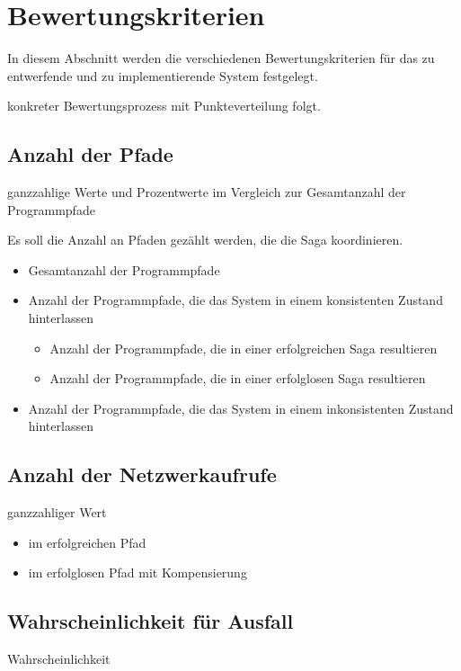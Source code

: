 \section{Bewertungskriterien}

In diesem Abschnitt werden die verschiedenen Bewertungskriterien für das zu entwerfende und zu implementierende System festgelegt. 

konkreter Bewertungsprozess mit Punkteverteilung folgt. %

\subsection{Anzahl der Pfade}
ganzzahlige Werte und Prozentwerte im Vergleich zur Gesamtanzahl der Programmpfade


Es soll die Anzahl an Pfaden gezählt werden, die die Saga koordinieren. 

\begin{itemize}
	\item Gesamtanzahl der Programmpfade
	\item Anzahl der Programmpfade, die das System in einem konsistenten Zustand hinterlassen
		\begin{itemize}
			\item Anzahl der Programmpfade, die in einer erfolgreichen Saga resultieren
			\item Anzahl der Programmpfade, die in einer erfolglosen Saga resultieren
		\end{itemize}
	\item Anzahl der Programmpfade, die das System in einem inkonsistenten Zustand hinterlassen
\end{itemize}


\subsection{Anzahl der Netzwerkaufrufe}
ganzzahliger Wert

\begin{itemize}
	\item im erfolgreichen Pfad
	\item im erfolglosen Pfad mit Kompensierung
\end{itemize}

\subsection{Wahrscheinlichkeit für Ausfall}
Wahrscheinlichkeit

